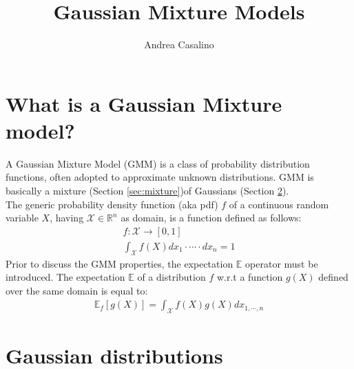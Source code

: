 \documentclass{article}
\author{Andrea Casalino}
\title{Gaussian Mixture Models}
\begin{document}
\maketitle

\newpage
\section{What is a Gaussian Mixture model?}

A Gaussian Mixture Model (GMM) is a class of probability distribution functions, often adopted to approximate unknown distributions. 
GMM is basically a mixture (Section \ref{sec:mixture})of Gaussians (Section \ref{sec:Gauss}).
\\
The generic probability density function (aka pdf) $f$ of a continuous random variable $X$, having $\mathcal{X} \in \mathbb{R}^n$ as domain, is a function defined as follows:
 \begin{eqnarray}
f:\mathcal{X} \rightarrow [0,1] 
\\
\int_{\mathcal{X}} f(X) dx_1 \cdot \cdots \cdot dx_n = 1
\label{eq:pdf}
\end{eqnarray}  
Prior to discuss the GMM properties, the expectation $\mathbb{E}$ operator must be introduced.
The expectation $\mathbb{E}$ of a distribution $f$ w.r.t a function $g(X)$ defined over the same domain is equal to:
\begin{eqnarray}
\mathbb{E}_f[g(X)] =  \int_{\mathcal{X}} f(X)g(X) dx_{1,\cdots,n}
\end{eqnarray}

\section{Gaussian distributions}
\label{sec:Gauss}
\end{document}
